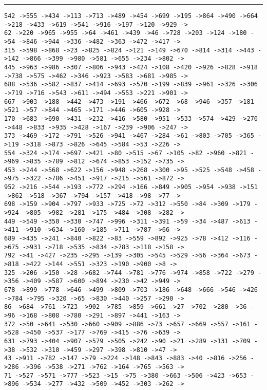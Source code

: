 \documentclass[letter, 12pt]{article}
\newenvironment{question}[1]{%
    \vspace{.2in}%
        \noindent{\bf #1}%
    \vspace{0.3em} \hrule \vspace{.1in}%
}{}
\begin{document}
\begin{question}{\large Appendix}
\begin{lstlisting}[style=CStyle]
542 ->555 ->434 ->113 ->713 ->489 ->454 ->699 ->195 ->864 ->490 ->664 ->218 ->433 ->619 ->541 ->916 ->197 ->120 ->929 ->
62 ->220 ->965 ->955 ->64 ->461 ->439 ->46 ->728 ->203 ->124 ->180 ->54 ->846 ->944 ->336 ->482 ->363 ->472 ->417 ->
315 ->598 ->868 ->23 ->825 ->824 ->121 ->149 ->670 ->814 ->314 ->443 ->142 ->866 ->399 ->980 ->581 ->655 ->234 ->802 ->
445 ->963 ->986 ->307 ->806 ->943 ->424 ->108 ->420 ->926 ->828 ->918 ->738 ->575 ->462 ->346 ->923 ->583 ->681 ->985 ->
688 ->536 ->582 ->837 ->414 ->693 ->570 ->199 ->839 ->961 ->326 ->306 ->719 ->716 ->543 ->611 ->494 ->553 ->221 ->901 ->
667 ->903 ->188 ->442 ->473 ->191 ->466 ->672 ->68 ->946 ->357 ->181 ->521 ->57 ->844 ->465 ->171 ->446 ->605 ->928 ->
170 ->683 ->690 ->431 ->232 ->416 ->580 ->951 ->533 ->574 ->429 ->270 ->448 ->833 ->935 ->428 ->167 ->239 ->906 ->247 ->
373 ->469 ->172 ->791 ->526 ->941 ->467 ->284 ->61 ->803 ->705 ->365 ->119 ->318 ->873 ->826 ->645 ->584 ->53 ->226 ->
554 ->324 ->174 ->697 ->421 ->80 ->515 ->67 ->105 ->82 ->960 ->821 ->969 ->835 ->789 ->812 ->674 ->853 ->152 ->735 ->
453 ->244 ->568 ->622 ->156 ->948 ->268 ->300 ->95 ->525 ->548 ->458 ->975 ->322 ->786 ->451 ->917 ->215 ->561 ->872 ->
952 ->216 ->544 ->193 ->772 ->294 ->166 ->849 ->905 ->954 ->938 ->151 ->862 ->518 ->367 ->794 ->157 ->418 ->98 ->77 ->
698 ->159 ->904 ->797 ->933 ->725 ->72 ->312 ->550 ->84 ->309 ->179 ->924 ->805 ->982 ->281 ->175 ->484 ->308 ->282 ->
449 ->549 ->350 ->330 ->747 ->996 ->311 ->391 ->59 ->34 ->487 ->613 ->411 ->910 ->634 ->160 ->185 ->711 ->787 ->66 ->
689 ->435 ->241 ->840 ->822 ->83 ->559 ->892 ->925 ->78 ->412 ->116 ->675 ->931 ->718 ->535 ->834 ->783 ->118 ->158 ->
792 ->41 ->427 ->235 ->295 ->139 ->305 ->545 ->529 ->56 ->364 ->673 ->818 ->422 ->144 ->551 ->323 ->190 ->900 ->8 ->
325 ->206 ->150 ->28 ->682 ->744 ->781 ->776 ->974 ->858 ->722 ->279 ->356 ->409 ->587 ->600 ->894 ->230 ->42 ->949 ->
678 ->899 ->778 ->646 ->499 ->809 ->703 ->186 ->648 ->666 ->546 ->426 ->784 ->795 ->320 ->65 ->830 ->440 ->257 ->290 ->
86 ->684 ->761 ->723 ->902 ->785 ->859 ->661 ->27 ->702 ->280 ->36 ->96 ->168 ->808 ->780 ->291 ->897 ->441 ->163 ->
372 ->50 ->641 ->530 ->660 ->909 ->886 ->73 ->657 ->669 ->557 ->161 ->528 ->450 ->537 ->177 ->769 ->415 ->76 ->639 ->
631 ->793 ->404 ->907 ->579 ->505 ->242 ->90 ->21 ->289 ->131 ->709 ->38 ->532 ->310 ->459 ->297 ->398 ->810 ->47 ->
43 ->911 ->782 ->147 ->79 ->224 ->148 ->843 ->883 ->40 ->816 ->256 ->286 ->396 ->538 ->271 ->762 ->164 ->765 ->563 ->
71 ->527 ->571 ->777 ->523 ->15 ->75 ->380 ->663 ->506 ->423 ->653 ->896 ->534 ->277 ->432 ->509 ->452 ->303 ->262 ->

\end{lstlisting}
\end{question}
\end{document}
